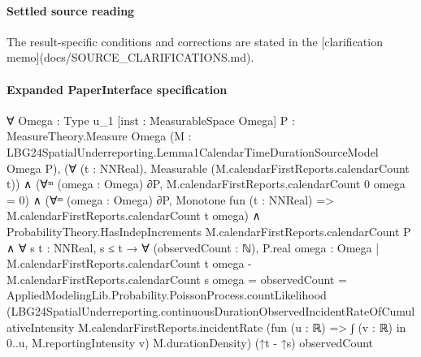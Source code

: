 \documentclass[10pt]{article}
\begin{document}
\paragraph{Settled source reading}
\begin{sloppypar}
The result-\allowbreak{}specific conditions and corrections are stated in the [clarification memo](docs/\allowbreak{}SOURCE\_\allowbreak{}CLARIFICATIONS.\allowbreak{}md).\allowbreak{}
\end{sloppypar}

\paragraph{Expanded PaperInterface specification}
\begin{ReviewVerbatim}
∀ {Omega : Type u_1} [inst : MeasurableSpace Omega] {P : MeasureTheory.Measure Omega}
  (M : LBG24SpatialUnderreporting.Lemma1CalendarTimeDurationSourceModel Omega P),
  (∀ (t : NNReal), Measurable (M.calendarFirstReports.calendarCount t)) ∧
    (∀ᵐ (omega : Omega) ∂P, M.calendarFirstReports.calendarCount 0 omega = 0) ∧
      (∀ᵐ (omega : Omega) ∂P, Monotone fun (t : NNReal) => M.calendarFirstReports.calendarCount t omega) ∧
        ProbabilityTheory.HasIndepIncrements M.calendarFirstReports.calendarCount P ∧
          ∀ {s t : NNReal},
            s ≤ t →
              ∀ (observedCount : ℕ),
                P.real
                    {omega : Omega |
                      M.calendarFirstReports.calendarCount t omega - M.calendarFirstReports.calendarCount s omega =
                        observedCount} =
                  AppliedModelingLib.Probability.PoissonProcess.countLikelihood
                    (LBG24SpatialUnderreporting.continuousDurationObservedIncidentRateOfCumulativeIntensity
                      M.calendarFirstReports.incidentRate (fun (u : ℝ) => ∫ (v : ℝ) in 0..u, M.reportingIntensity v)
                      M.durationDensity)
                    (↑t - ↑s) observedCount
\end{ReviewVerbatim}
\end{document}
